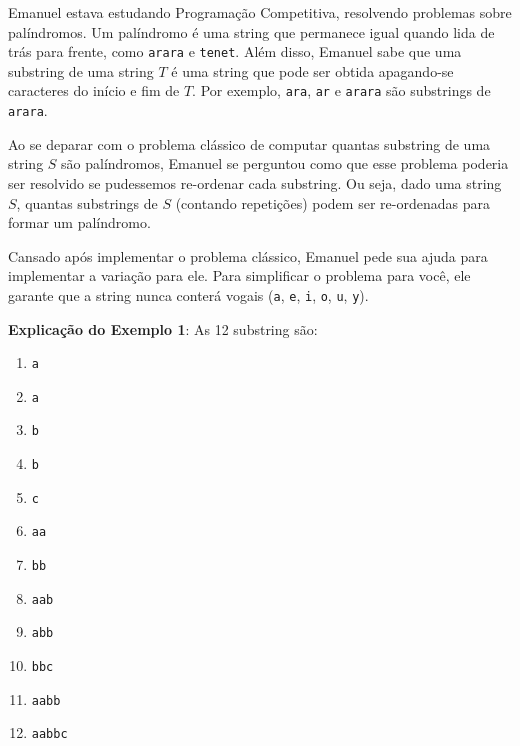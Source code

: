 %

Emanuel estava estudando Programação Competitiva, resolvendo problemas sobre palíndromos. Um palíndromo é uma string que permanece igual quando lida de trás para frente, como {\tt arara} e {\tt tenet}. Além disso, Emanuel sabe que uma substring de uma string $T$ é uma string que pode ser obtida apagando-se caracteres do início e fim de $T$. Por exemplo, {\tt ara}, {\tt ar} e {\tt arara} são substrings de {\tt arara}.

Ao se deparar com o problema clássico de computar quantas substring de uma string $S$ são palíndromos, Emanuel se perguntou como que esse problema poderia ser resolvido se pudessemos re-ordenar cada substring. Ou seja, dado uma string $S$, quantas substrings de $S$ (contando repetições) podem ser re-ordenadas para formar um palíndromo.

Cansado após implementar o problema clássico, Emanuel pede sua ajuda para implementar a variação para ele. Para simplificar o problema para você, ele garante que a string nunca conterá vogais ({\tt a}, {\tt e}, {\tt i}, {\tt o}, {\tt u}, {\tt y}).

%
%

%
%



\sampleio

\bigskip
\textbf{Explicação do Exemplo 1}: As 12 substring são:

\begin{multicols}{2}
\begin{enumerate}
	\item {\tt a}
	\item {\tt a}
	\item {\tt b}
	\item {\tt b}
	\item {\tt c}
	\item {\tt aa}
	\item {\tt bb}
	\item {\tt aab}
	\item {\tt abb}
	\item {\tt bbc}
	\item {\tt aabb}
	\item {\tt aabbc}
\end{enumerate}
\end{multicols}
